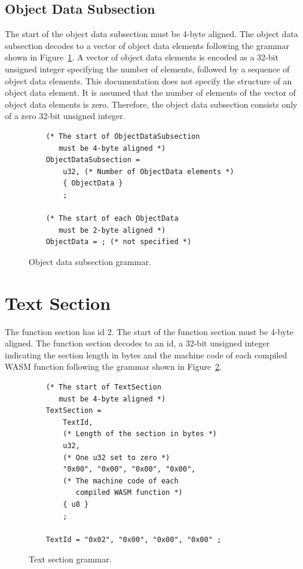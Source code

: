 \documentclass{article}
\begin{document}
\subsection{Object Data Subsection}
The start of the object data subsection must be 4-byte aligned.
The object data subsection decodes to a vector of object data elements following the grammar shown in Figure~\ref{fig:object-data-subsection-grammar}.
A vector of object data elements is encoded as a 32-bit unsigned integer specifying the
number of elements, followed by a sequence of object data elements.
This documentation does not specify the structure of an object data element.
It is assumed that the number of elements of the vector of object data elements is zero.
Therefore, the object data subsection consists only of a zero 32-bit unsigned integer.


\begin{figure}[H]
\begin{verbatim}
    (* The start of ObjectDataSubsection
       must be 4-byte aligned *)
    ObjectDataSubsection =
        u32, (* Number of ObjectData elements *)
        { ObjectData }
        ;

    (* The start of each ObjectData
       must be 2-byte aligned *)
    ObjectData = ; (* not specified *)
\end{verbatim}
\caption{Object data subsection grammar.}
\label{fig:object-data-subsection-grammar}
\end{figure}

\section{Text Section}
The function section has id 2.
The start of the function section must be 4-byte aligned.
The function section decodes to an id, a 32-bit unsigned integer indicating the section length in bytes and the machine code of each compiled WASM function following the grammar shown in Figure~\ref{fig:text-section-grammar}.

\begin{figure}[H]
\begin{verbatim}
    (* The start of TextSection
       must be 4-byte aligned *)
    TextSection =
        TextId,
        (* Length of the section in bytes *)
        u32,
        (* One u32 set to zero *)
        "0x00", "0x00", "0x00", "0x00",
        (* The machine code of each
           compiled WASM function *)
        { u8 }
        ;

    TextId = "0x02", "0x00", "0x00", "0x00" ;
\end{verbatim}
\caption{Text section grammar.}
\label{fig:text-section-grammar}
\end{figure}
\end{document}
